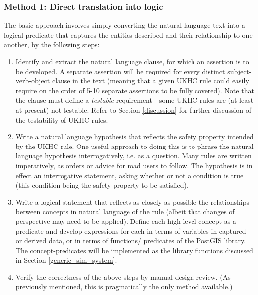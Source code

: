 \subsubsection{Method 1: Direct translation into logic} \label{direct_translation}

The basic approach involves simply converting the natural language text into a logical predicate that captures the entities described and their relationship to one another, by the following steps: 
\begin{enumerate}
    \item Identify and extract the natural language clause, for which an assertion is to be developed. A separate assertion will be required for every distinct subject-verb-object clause in the text (meaning that a given UKHC rule could easily require on the order of 5-10 separate assertions to be fully covered). Note that the clause must define a \emph{testable} requirement - some UKHC rules are (at least at present) not testable. Refer to Section \ref{discussion} for further discussion of the testability of UKHC rules.
    \item Write a natural language hypothesis that reflects the safety property intended by the UKHC rule. One useful approach to doing this is to phrase the natural language hypothesis interrogatively, i.e. as a question. Many rules are written imperatively, as orders or advice for road users to follow. The hypothesis is in effect an interrogative statement, asking whether or not a condition is true (this condition being the safety property to be satisfied). 
    \item Write a logical statement that reflects as closely as possible the relationships between concepts in natural language of the rule (albeit that changes of perspective may need to be applied). Define each high-level concept as a predicate and develop expressions for each in terms of variables in captured or derived data, or in terms of functions/ predicates of the PostGIS library. The concept-predicates will be implemented as the library functions discussed in Section \ref{generic_sim_system}.%
    \item Verify the correctness of the above steps by manual design review. (As previously mentioned, this is pragmatically the only method available.)
\end{enumerate}

